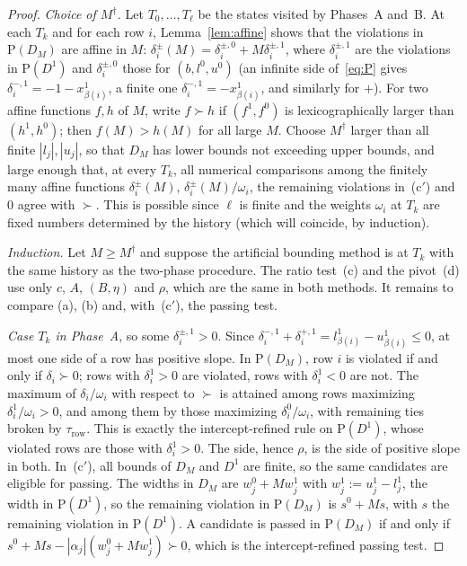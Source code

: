 \documentclass[11pt,a4paper]{article}
\theoremstyle{plain}
\theoremstyle{definition}
\theoremstyle{remark}
\newcommand{\Pb}{\mathrm{P}}
\begin{document}
\begin{proof}
\emph{Choice of $M^\dagger$.} Let $T_0,\dots,T_\ell$ be the states visited by Phases~A and~B. At each $T_k$ and for each row $i$, Lemma~\ref{lem:affine} shows that the violations in $\Pb(D_M)$ are affine in $M$:
$\delta_i^\pm(M)=\delta_i^{\pm,0}+M\delta_i^{\pm,1}$, where $\delta^{\pm,1}_i$ are the violations in $\Pb(D^1)$ and $\delta^{\pm,0}_i$ those for $(b,l^0,u^0)$ (an infinite side of~\eqref{eq:P} gives $\delta^{-,1}_i=-1-x^1_{\beta(i)}$, a finite one $\delta^{-,1}_i=-x^1_{\beta(i)}$, and similarly for $+$). For two affine functions $f,h$ of $M$, write $f\succ h$ if $(f^1,f^0)$ is lexicographically larger than $(h^1,h^0)$; then $f(M)>h(M)$ for all large $M$. Choose $M^\dagger$ larger than all finite $|l_j|,|u_j|$, so that $D_M$ has lower bounds not exceeding upper bounds, and large enough that, at every $T_k$, all numerical comparisons among the finitely many affine functions $\delta_i^\pm(M)$, $\delta_i^\pm(M)/\omega_i$, the remaining violations in~(c$'$) and $0$ agree with $\succ$. This is possible since $\ell$ is finite and the weights $\omega_i$ at $T_k$ are fixed numbers determined by the history (which will coincide, by induction).

\emph{Induction.} Let $M\ge M^\dagger$ and suppose the artificial bounding method is at $T_k$ with the same history as the two-phase procedure. The ratio test~(c) and the pivot~(d) use only $c$, $A$, $(B,\eta)$ and $\rho$, which are the same in both methods. It remains to compare (a), (b) and, with~(c$'$), the passing test.

\emph{Case $T_k$ in Phase~A}, so some $\delta^{\pm,1}_i>0$. Since $\delta^{-,1}_i+\delta^{+,1}_i=l^1_{\beta(i)}-u^1_{\beta(i)}\le0$, at most one side of a row has positive slope. In $\Pb(D_M)$, row $i$ is violated if and only if $\delta_i\succ0$; rows with $\delta^1_i>0$ are violated, rows with $\delta_i^1<0$ are not. The maximum of $\delta_i/\omega_i$ with respect to $\succ$ is attained among rows maximizing $\delta^1_i/\omega_i>0$, and among them by those maximizing $\delta^0_i/\omega_i$, with remaining ties broken by $\tau_{\mathrm{row}}$. This is exactly the intercept-refined rule on $\Pb(D^1)$, whose violated rows are those with $\delta^1_i>0$. The side, hence $\rho$, is the side of positive slope in both. In~(c$'$), all bounds of $D_M$ and $D^1$ are finite, so the same candidates are eligible for passing. The widths in $D_M$ are $w^0_j+Mw^1_j$ with $w^1_j:=u^1_j-l^1_j$, the width in $\Pb(D^1)$, so the remaining violation in $\Pb(D_M)$ is $s^0+Ms$, with $s$ the remaining violation in $\Pb(D^1)$. A candidate is passed in $\Pb(D_M)$ if and only if $s^0+Ms-|\alpha_j|(w^0_j+Mw^1_j)\succ0$, which is the intercept-refined passing test.


\end{proof}
\end{document}
